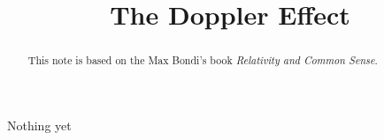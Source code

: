 \documentclass{ximera}
\title{The Doppler Effect}
\begin{document}
\begin{abstract}
This note is based on the Max Bondi's book \emph{Relativity and Common Sense}.
\end{abstract}
\maketitle


Nothing yet
\end{document}
